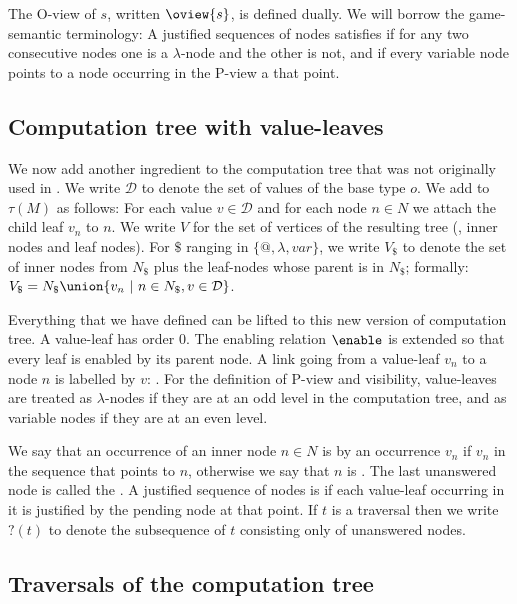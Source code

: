 The O-view of $s$, written $\oview{s}$, is defined dually. We will
borrow the game-semantic terminology: A justified sequences of nodes
satisfies  if for any two consecutive nodes one
is a $\lambda$-node and the other is not, and 
if every variable node points to a node occurring in the P-view a
that point.

\subsection{Computation tree with value-leaves}


We now add another ingredient to the computation tree that was not
originally used in \cite{OngLics2006}.  We write $\mathcal{D}$ to
denote the set of values of the base type $o$.  We add
 to $\tau(M)$ as follows: For each value $v
\in \mathcal{D}$ and for each node $n \in N$ we attach the child
leaf $v_n$ to $n$.  We write $V$ for the set of vertices of the
resulting tree (\ie, inner nodes and leaf nodes). For $\$$ ranging in
$\{@, \lambda, var \}$, we write $V_\$$ to denote the set of inner
nodes from $N_\$$ plus the leaf-nodes whose parent is in $N_\$$; formally:
$V_\$ = N_\$ \union \{ v_n \ | \ n \in N_\$, v \in \mathcal{D} \}$.


Everything that we have defined can be lifted to this new version of
computation tree. A value-leaf has order $0$. The enabling relation
$\enable$ is extended so that every leaf is enabled by its parent
node. A link going from a value-leaf $v_n$ to a node $n$ is labelled
by $v$: . For the
definition of P-view and visibility, value-leaves are treated as
$\lambda$-nodes if they are at an odd level in the computation tree,
and as variable nodes if they are at an even level.

We say that an occurrence of an inner node $n \in N$ is
 by an occurrence $v_n$ if $v_n$ in
the sequence that points to $n$, otherwise we say that $n$ is
. The last unanswered node is called the
.  A justified sequence of nodes is
 if each value-leaf occurring in it is justified by the pending node at that point.  If $t$ is a traversal then we write
$?(t)$ to denote the subsequence of $t$ consisting only of
unanswered nodes.

\subsection{Traversals of the computation tree}
\label{subsec:traversal}

